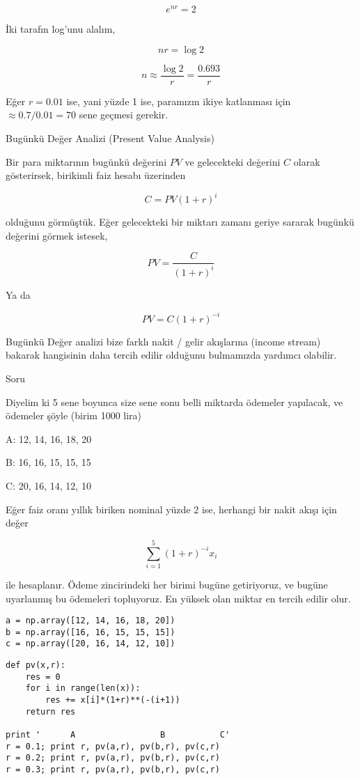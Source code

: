 \documentclass[12pt,fleqn]{article}\usepackage{../../common}
\begin{document}
$$ e^{nr} = 2 $$

İki tarafın log'unu alalım,

$$ nr = \log 2 $$

$$ n \approx \frac{\log 2}{r} = \frac{0.693}{r} $$

Eğer $r = 0.01$ ise, yani yüzde 1 ise, paramızın ikiye katlanması için $\approx
0.7 / 0.01 = 70$ sene geçmesi gerekir. 

Bugünkü Değer Analizi (Present Value Analysis)

Bir para miktarının bugünkü değerini $PV$ ve gelecekteki değerini $C$ olarak
gösterirsek, birikimli faiz hesabı üzerinden

$$ C = PV (1+r)^i $$

olduğunu görmüştük. Eğer gelecekteki bir miktarı zamanı geriye sararak bugünkü
değerini görmek istesek, 

$$ PV = \frac{C}{ (1+r)^i}  $$

Ya da

$$ PV = C (1+r)^{-i}  $$

Bugünkü Değer analizi bize farklı nakit / gelir akışlarına (income stream)
bakarak hangisinin daha tercih edilir olduğunu bulmamızda yardımcı olabilir.

Soru

Diyelim ki 5 sene boyunca size sene sonu belli miktarda ödemeler yapılacak, ve
ödemeler şöyle (birim 1000 lira)

A: 12, 14, 16, 18, 20

B: 16, 16, 15, 15, 15

C: 20, 16, 14, 12, 10

Eğer faiz oranı yıllık biriken nominal yüzde 2 ise, herhangi bir nakit akışı
için değer

$$ \sum _{i=1}^{5} (1+r)^{-i} x_i$$

ile hesaplanır. Ödeme zincirindeki her birimi bugüne getiriyoruz, ve bugüne
uyarlanmış bu ödemeleri topluyoruz. En yüksek olan miktar en tercih edilir
olur. 

\begin{verbatim}
a = np.array([12, 14, 16, 18, 20])
b = np.array([16, 16, 15, 15, 15])
c = np.array([20, 16, 14, 12, 10])
\end{verbatim}


\begin{verbatim}
def pv(x,r):
    res = 0
    for i in range(len(x)):
        res += x[i]*(1+r)**(-(i+1))
    return res

print '      A                 B           C'
r = 0.1; print r, pv(a,r), pv(b,r), pv(c,r)
r = 0.2; print r, pv(a,r), pv(b,r), pv(c,r)
r = 0.3; print r, pv(a,r), pv(b,r), pv(c,r)
\end{verbatim}
\end{document}
